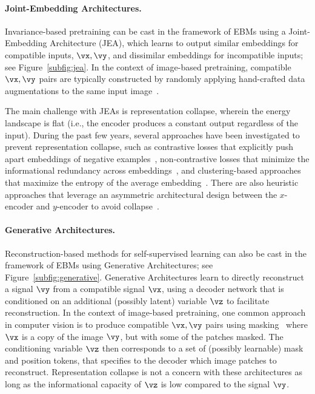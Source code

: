 \documentclass[10pt,twocolumn,letterpaper]{article}
\begin{document}
\paragraph{Joint-Embedding Architectures.}
Invariance-based pretraining can be cast in the framework of EBMs using a Joint-Embedding Architecture (JEA), which learns to output similar embeddings for compatible inputs, $\vx,\vy$, and dissimilar embeddings for incompatible inputs; see Figure~\ref{subfig:jea}.
In the context of image-based pretraining, compatible $\vx,\vy$ pairs are typically constructed by randomly applying hand-crafted data augmentations to the same input image~\cite{chen2020simple}.

The main challenge with JEAs is representation collapse, wherein the energy landscape is flat (i.e., the encoder produces a constant output regardless of the input).
During the past few years, several approaches have been investigated to prevent representation collapse, such as contrastive losses that explicitly push apart embeddings of negative examples~\cite{bromley1993signature,he2019moco,chen2020exploring}, non-contrastive losses that minimize the informational redundancy across embeddings~\cite{zbontar2021barlow,bardes2021vicreg}, and clustering-based approaches that maximize the entropy of the average embedding~\cite{caron2021emerging,assran2021semi, assran2022masked}.
There are also heuristic approaches that leverage an asymmetric architectural design between the $x$-encoder and $y$-encoder to avoid  collapse~\cite{chen2020exploring,grill2020bootstrap,baevski2022data2vec}.

\paragraph{Generative Architectures.}
Reconstruction-based methods for self-supervised learning can also be cast in the framework of EBMs using Generative Architectures; see Figure~\ref{subfig:generative}.
Generative Architectures learn to directly reconstruct a signal $\vy$ from a compatible signal $\vx$, using a decoder
network that is conditioned on an additional (possibly latent) variable $\vz$ to facilitate reconstruction.
In the context of image-based pretraining, one common approach in computer vision is to produce compatible $\vx,\vy$ pairs using masking~\cite{he2016deep,bao2021beit} where $\vx$ is a copy of the image $\vy$, but with some of the patches masked.
The conditioning variable $\vz$ then corresponds to a set of (possibly learnable) mask and position tokens, that specifies to the decoder which image patches to reconstruct.
Representation collapse is not a concern with these architectures as long as the informational capacity of $\vz$ is low compared to the signal $\vy$.
\end{document}
